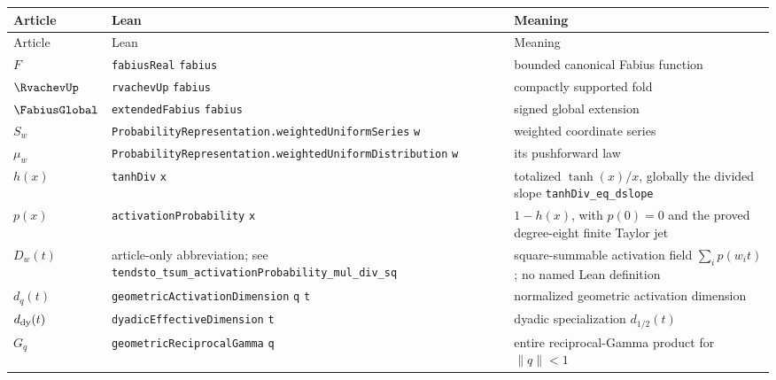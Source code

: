 \documentclass[11pt,oneside]{article}
\theoremstyle{definition}
\theoremstyle{remark}
\newcommand{\lean}[1]{%
  \ifmmode\text{\nolinkurl{#1}}\else\nolinkurl{#1}\fi}
\begin{document}
\begin{longtable}{@{}
  >{\raggedright\arraybackslash}p{}
  >{\raggedright\arraybackslash}p{}
  >{\raggedright\arraybackslash}p{}@{}}
\toprule
Article & Lean & Meaning\\
\midrule
\endfirsthead
\toprule
Article & Lean & Meaning\\
\midrule
\endhead
\(F\) & \lean{fabiusReal}\hspace{0.35em}\lean{fabius} & bounded canonical Fabius function\\
\(\RvachevUp\) & \lean{rvachevUp}\hspace{0.35em}\lean{fabius} & compactly supported fold\\
\(\FabiusGlobal\) & \lean{extendedFabius}\hspace{0.35em}\lean{fabius} & signed global extension\\
\(S_w\) & \lean{ProbabilityRepresentation.weightedUniformSeries}\hspace{0.35em}\lean{w} & weighted coordinate series\\
\(\mu_w\) & \lean{ProbabilityRepresentation.weightedUniformDistribution}\hspace{0.35em}\lean{w} & its pushforward law\\
\(h(x)\) & \lean{tanhDiv}\hspace{0.35em}\lean{x} & totalized \(\tanh(x)/x\), globally the divided slope \lean{tanhDiv_eq_dslope}\\
\(p(x)\) & \lean{activationProbability}\hspace{0.35em}\lean{x} & \(1-h(x)\), with \(p(0)=0\) and the proved degree-eight finite Taylor jet\\
\(D_w(t)\) & article-only abbreviation; see \lean{tendsto_tsum_activationProbability_mul_div_sq} & square-summable activation field \(\sum_i p(w_it)\); no named Lean definition\\
\(d_q(t)\) & \lean{geometricActivationDimension}\hspace{0.35em}\lean{q}\hspace{0.35em}\lean{t} & normalized geometric activation dimension\\
\(d_{\rm dy}(t)\) & \lean{dyadicEffectiveDimension}\hspace{0.35em}\lean{t} & dyadic specialization \(d_{1/2}(t)\)\\
\(G_q\) & \lean{geometricReciprocalGamma}\hspace{0.35em}\lean{q} & entire reciprocal-Gamma product for \(\lVert q\rVert<1\)\\

\end{longtable}
\end{document}
